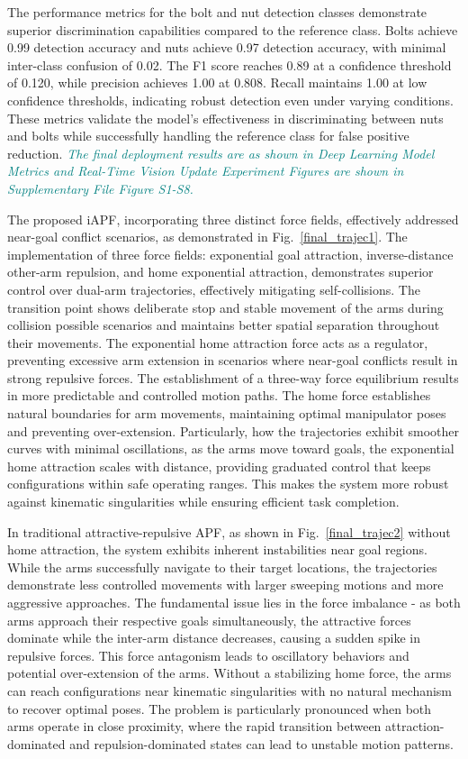 \documentclass[utf8]{FrontiersinHarvard}
\begin{document}
The performance metrics for the bolt and nut detection classes demonstrate superior discrimination capabilities compared to the reference class. Bolts achieve 0.99 detection accuracy and nuts achieve 0.97 detection accuracy, with minimal inter-class confusion of 0.02. The F1 score reaches 0.89 at a confidence threshold of 0.120, while precision achieves 1.00 at 0.808. Recall maintains 1.00 at low confidence thresholds, indicating robust detection even under varying conditions. These metrics validate the model's effectiveness in discriminating between nuts and bolts while successfully handling the reference class for false positive reduction. \textit{\textcolor{teal}{The final deployment results are as shown in Deep Learning Model Metrics and
Real-Time Vision Update Experiment Figures are shown in Supplementary File Figure S1-S8.}}

The proposed iAPF, incorporating three distinct force fields, effectively addressed near-goal conflict scenarios, as demonstrated in Fig.~\ref{final_trajec1}. The implementation of three force fields: exponential goal attraction, inverse-distance other-arm repulsion, and home exponential attraction, demonstrates superior control over dual-arm trajectories, effectively mitigating self-collisions. The transition point shows deliberate stop and stable movement of the arms during collision possible scenarios and maintains better spatial separation throughout their movements. The exponential home attraction force acts as a regulator, preventing excessive arm extension in scenarios where near-goal conflicts result in strong repulsive forces. The establishment of a three-way force equilibrium results in more predictable and controlled motion paths. The home force establishes natural boundaries for arm movements, maintaining optimal manipulator poses and preventing over-extension. Particularly, how the trajectories exhibit smoother curves with minimal oscillations, as the arms move toward goals, the exponential home attraction scales with distance, providing graduated control that keeps configurations within safe operating ranges. This makes the system more robust against kinematic singularities while ensuring efficient task completion.

In traditional attractive-repulsive APF, as shown in Fig.~\ref{final_trajec2} without home attraction, the system exhibits inherent instabilities near goal regions. While the arms successfully navigate to their target locations, the trajectories demonstrate less controlled movements with larger sweeping motions and more aggressive approaches. The fundamental issue lies in the force imbalance - as both arms approach their respective goals simultaneously, the attractive forces dominate while the inter-arm distance decreases, causing a sudden spike in repulsive forces. This force antagonism leads to oscillatory behaviors and potential over-extension of the arms. Without a stabilizing home force, the arms can reach configurations near kinematic singularities with no natural mechanism to recover optimal poses. The problem is particularly pronounced when both arms operate in close proximity, where the rapid transition between attraction-dominated and repulsion-dominated states can lead to unstable motion patterns.
\end{document}
